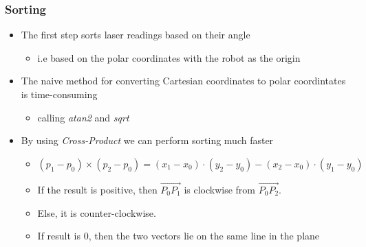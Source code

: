 \begin{frame}
\label{frame:Sorting}
\frametitle{Sorting}
\begin{itemize}
  \item The first step sorts laser readings based on their angle
  	\begin{itemize}
  	  \item i.e based on the polar coordinates with the robot as the origin
  	\end{itemize} \pause
  \item The naive method for converting Cartesian coordinates to polar
  coordintates is time-consuming
  	\begin{itemize}
  	  \item calling \emph{atan2} and \emph{sqrt}
  	\end{itemize} \pause
  \item By using \emph{Cross-Product} we can perform sorting much faster
  	\begin{itemize}
  	  \item
  	  $(p_1-p_0)\times(p_2-p_0)=(x_1-x_0)\cdot(y_2-y_0)-(x_2-x_0)\cdot(y_1-y_0)$
  	  \pause
	  \item If the result is positive, then $\overrightarrow{P_0P_1}$ is clockwise from
		$\overrightarrow{P_0P_2}$.
	  \item Else, it is counter-clockwise. 
	  \item If result is 0, then the two vectors lie on the same line in the plane
	\end{itemize}
	\hyperlink{frame:FFD_Sorting}{}
\end{itemize}
\end{frame}
